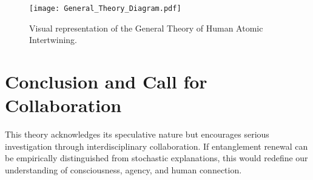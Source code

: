 \documentclass[11pt]{article}
\begin{document}
\begin{figure}[htbp]
\centering
\texttt{[image: General\_Theory\_Diagram.pdf]}
\caption{Visual representation of the General Theory of Human Atomic Intertwining.}
\label{fig:atomic-intertwining}
\end{figure}

\section{Conclusion and Call for Collaboration}

This theory acknowledges its speculative nature but encourages serious investigation through interdisciplinary collaboration. If entanglement renewal can be empirically distinguished from stochastic explanations, this would redefine our understanding of consciousness, agency, and human connection.



\end{document}

